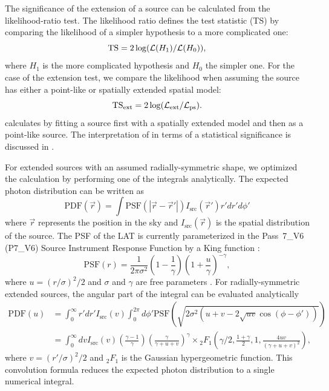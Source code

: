 The significance of the extension of a source can be calculated from the
likelihood-ratio test. The likelihood ratio defines the test statistic
(TS) by comparing the likelihood of a simpler hypothesis to a more
complicated one:
\begin{equation}
  \mathrm{TS}=2\log(\mathcal{L}(H_1)/\mathcal{L}(H_0)),
\end{equation}
where $H_1$ is the more complicated hypothesis and $H_0$ the simpler one.
For the case of the extension test, we compare the likelihood when
assuming the source has either a point-like or spatially extended
spatial model:
\begin{equation}
  \mathrm{TS}_\mathrm{ext}=2\log(\mathcal{L}_\text{ext}/\mathcal{L}_\text{ps}).
\end{equation}
\pointlike calculates \tsext by fitting a source first with a spatially
extended model and then as a point-like source.  The interpretation
of \tsext in terms of a statistical significance is discussed in
.

For extended sources with an assumed radially-symmetric shape, we
optimized the calculation by performing one of the integrals analytically.
The expected photon distribution can be written as
\begin{equation}
  \text{PDF}(\vec r) = \int  \text{PSF}(|\vec r - \vec r'|)I_\text{src}(\vec r') r' dr' d\phi'
\end{equation}
where $\vec r$ represents the position in the sky and $I_\text{src}(\vec
r)$ is the spatial distribution of the source.  The PSF of the LAT is
currently parameterized in the Pass~7\_V6 (P7\_V6) Source Instrument
Response Function \citep[IRFs,][]{ackermann_2012a_fermi-large} by a King
function \citep{king_1962a_structure-clusters.}:
\begin{equation}
  \text{PSF}(r) = 
  \frac{1}{2\pi\sigma^2}
  \left(1-\frac{1}{\gamma}\right)
  \left(1+\frac{u}{\gamma}\right)^{-\gamma},
\end{equation}
where $u=(r/\sigma)^2/2$ and $\sigma$ and $\gamma$ are free parameters
\citep{kerr_2010a_likelihood-methods}.  For radially-symmetric extended
sources, the angular part of the integral can be evaluated analytically
\begin{align}
  \text{PDF}(u) & = \int_0^\infty r' dr'
  I_\text{src}(v) 
  \int_0^{2\pi} d\phi' 
  \text{PSF}(\sqrt{2\sigma^2(u+v-2\sqrt{uv}\cos(\phi-\phi'))})
  \\
  & = \int_0^\infty dv
  I_\text{src}(v) 
  \left(\frac{\gamma-1}{\gamma}\right)
  \left( \frac{\gamma}{\gamma + u + v}\right)^\gamma 
  \times {}_2F_1 \left(\gamma/2,\frac{1+\gamma}{2},1,\frac{4uv}{(\gamma+u+v)^2}\right),
\end{align}
where $v=(r'/\sigma)^2/2$ and ${}_2F_1$ is the Gaussian hypergeometric
function.  This convolution formula reduces the expected photon
distribution to a single numerical integral.


